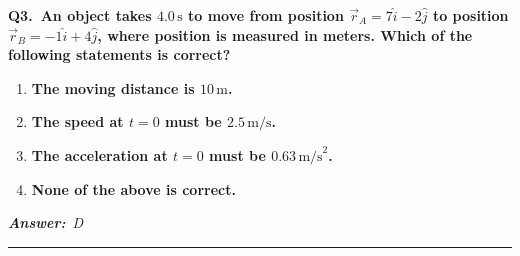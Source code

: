 \documentclass[11pt]{article}
\newcommand{\QuestionStyle}[1]{{\large\bfseries\boldmath #1}}
\newcommand{\AnswerStyle}[1]{{\large\bfseries\boldmath #1}}
\newcommand{\ReasonStyle}[1]{{\normalsize #1}}
\newif\ifshowreason
\newcommand{\Correct}[2]{%
  \item \AnswerStyle{\textcolor{AnsRed}{#1}}%
  \ifshowreason\\[-0.2em]
    \ReasonStyle{\textcolor{AnsRed}{#2}}%
  \fi
}
\newcommand{\Wrong}[2]{%
  \item \AnswerStyle{\textcolor{WrongBlue}{#1}}%
  \ifshowreason\\[-0.2em]
    \ReasonStyle{\textcolor{WrongBlue}{#2}}%
  \fi
}
\newcommand{\QBlock}[4]{%
  \Needspace{8\baselineskip}%
  \noindent
  \begin{minipage}{\linewidth}
    \QuestionStyle{#1.~#2}

    \vspace{0.25em}
    \begin{enumerate}
      #3
    \end{enumerate}

    \vspace{0.1em}
    \noindent\textcolor{AnsRed}{\textit{\textbf{Answer:}~#4}}

    \vspace{0.25em}
    \hrule height 0.4pt
  \end{minipage}
  \vspace{0.75em}
}
\begin{document}
\QBlock{Q3}{An object takes $4.0\,\text{s}$ to move from position $\vec r_A = 7\hat i - 2\hat j$ to position $\vec r_B = -1\hat i + 4\hat j$, where position is measured in meters. Which of the following statements is correct?}{
\Wrong{The moving distance is $10\,\text{m}$.}{$10\,\text{m}$ is the magnitude of the displacement, found from the endpoints, not necessarily the total path length traveled.}
\Wrong{The speed at $t=0$ must be $2.5\,\text{m/s}$.}{This likely comes from dividing displacement magnitude by elapsed time, which gives at best an average rate based on endpoints, not the instantaneous speed at $t=0$.}
\Wrong{The acceleration at $t=0$ must be $0.63\,\text{m/s}^2$.}{The initial acceleration cannot be determined uniquely from only the initial position, final position, and total elapsed time.}
\Correct{None of the above is correct.}{From the positions, the displacement is $\Delta\vec r = (-1-7)\hat i + (4-(-2))\hat j = -8\hat i + 6\hat j$, whose magnitude is $|\Delta\vec r|=\sqrt{(-8)^2+6^2}=10\,\text{m}$. However, that value is the displacement magnitude, not necessarily the moving distance, and the initial speed and initial acceleration are not fixed by endpoint data alone, so none of the other statements must be true.}
}{D}
\end{document}

